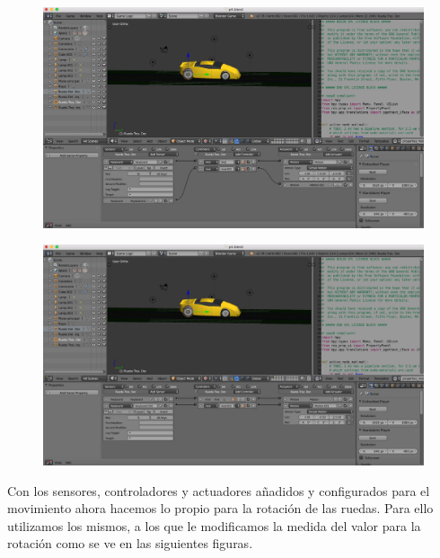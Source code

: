 \documentclass[10pt]{article}
\begin{document}
\begin{figure}[H]
	\begin{center}
	 		\includegraphics[width = 1.00\textwidth]{Imagenes/p4-img11}
	\end{center} 
\end{figure}

\begin{figure}[H]
	\begin{center}
	 		\includegraphics[width = 1.00\textwidth]{Imagenes/p4-img12}
	\end{center} 
\end{figure}

Con los sensores, controladores y actuadores añadidos y configurados para el movimiento ahora hacemos lo propio para la rotación de las ruedas. Para ello utilizamos los mismos, a los que le modificamos la medida del valor para la rotación como se ve en las siguientes figuras. \\
\end{document}
